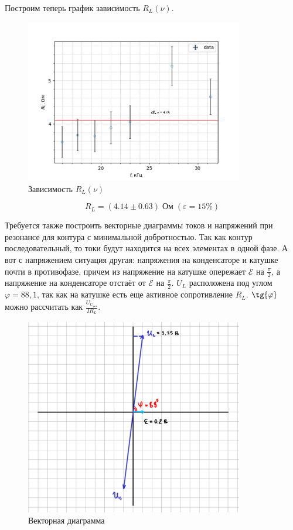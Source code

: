 \documentclass[a4paper, 12pt]{article}
\begin{document}
Построим теперь график зависимость $R_L(\nu)$.

\begin{figure}[H]
    \centering
    \includegraphics[width = 0.85\textwidth]{R_L-f_0/graphs/marked.pdf}
    \caption{Зависимость $R_L(\nu)$}
\end{figure}


\begin{equation}
    R_L = (4.14 \pm 0.63) \; \text{Ом} \; (\varepsilon = 15 \%)
\end{equation}

Требуется также построить векторные диаграммы токов и напряжений при резонансе для контура с минимальной добротностью. Так как контур последовательный, то токи будут находится на всех элементах в одной фазе. А вот с напряжением ситуация другая: напряжения на конденсаторе и катушке почти в противофазе, причем из напряжение на катушке опережает $\mathcal{E}$ на $\frac{\pi}{2}$, а напряжение на конденсаторе отстаёт от $\mathcal{E}$ на $\frac{\pi}{2}$.
	$U_L$ расположена под углом $\varphi = 88,1$\textdegree, так как на катушке есть еще активное сопротивление $R_L$. $\tg{\varphi}$ можно рассчитать как $\frac{U_{C_{\text{рез}}}}{IR_L}$.

\begin{figure}[H]
    \centering
    \includegraphics[width = 0.85\textwidth]{vecd.pdf}
    \caption{Векторная диаграмма}
\end{figure}
\end{document}
